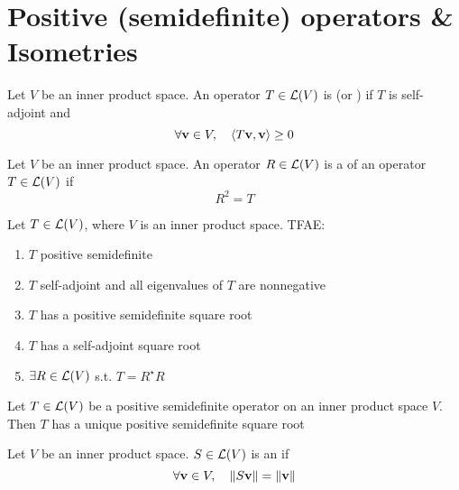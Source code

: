 \documentclass[aspectratio=169]{beamer}
\begin{document}
\section{Positive (semidefinite) operators \& Isometries}

\begin{frame}
\begin{definition}
Let $V$ be an inner product space. An operator $T\in\mathcal{L}(V)$ is  (or ) if $T$ is self-adjoint and
\[
\forall\mathbf{v}\in V,\quad 
\langle T\mathbf{v},\mathbf{v}\rangle \geq 0
\]
\end{definition}
\vfill
\begin{definition}
Let $V$ be an inner product space. An operator $R\in\mathcal{L}(V)$ is a  of an operator $T\in\mathcal{L}(V)$ if
\[
R^2=T
\]
\end{definition}
\end{frame}


\begin{frame}
\begin{importanttheorem}
Let $T\in\mathcal{L}(V)$, where $V$ is an inner product space. TFAE:
\begin{enumerate}
\item $T$ positive semidefinite
\item $T$ self-adjoint and all eigenvalues of $T$ are nonnegative
\item $T$ has a positive semidefinite square root
\item $T$ has a self-adjoint square root
\item $\exists R\in\mathcal{L}(V)$ s.t. $T=R^\star R$
\end{enumerate}
\end{importanttheorem}
\vfill
\begin{theorem}
Let $T\in\mathcal{L}(V)$ be a positive semidefinite operator on an inner product space $V$. Then $T$ has a unique positive semidefinite square root
\end{theorem}
\end{frame}


\begin{frame}
\begin{definition}[Isometry]
Let $V$ be an inner product space. $S\in\mathcal{L}(V)$ is an  if
\[
\forall\mathbf{v}\in V,\quad \|S\mathbf{v}\|=\|\mathbf{v}\|
\]
\end{definition}
\end{frame}
\end{document}
